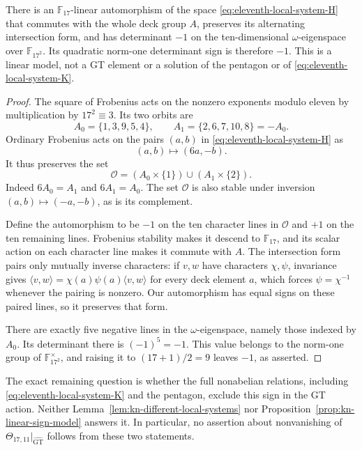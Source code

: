 \begin{proposition}\label{prop:kn-linear-sign-model}
There is an $\mathbb F_{17}$-linear automorphism of the space \eqref{eq:eleventh-local-system-H}
that commutes with the whole deck group $A$, preserves its
alternating intersection form, and has determinant $-1$ on the
ten-dimensional $\omega$-eigenspace over $\mathbb F_{17^2}$.
Its quadratic norm-one determinant sign is therefore $-1$.
This is a linear model, not a GT element or a solution of the
pentagon or of \eqref{eq:eleventh-local-system-K}.
\end{proposition}
\begin{proof}
The square of Frobenius acts on the nonzero exponents modulo
eleven by multiplication by $17^2\equiv3$.  Its two orbits are
\[
 A_0=\{1,3,9,5,4\},\qquad
 A_1=\{2,6,7,10,8\}=-A_0.
\]
Ordinary Frobenius acts on the pairs $(a,b)$ in \eqref{eq:eleventh-local-system-H} as
\[
 (a,b)\longmapsto(6a,-b).
\]
It thus preserves the set
\[
 \mathcal O=(A_0\times\{1\})\cup(A_1\times\{2\}).
\]
Indeed $6A_0=A_1$ and $6A_1=A_0$.
The set $\mathcal O$ is also stable under inversion
$(a,b)\mapsto(-a,-b)$, as is its complement.

Define the automorphism to be $-1$ on the ten character lines in
$\mathcal O$ and $+1$ on the ten remaining lines.  Frobenius
stability makes it descend to $\mathbb F_{17}$, and its scalar
action on each character line makes it commute with $A$.
The intersection form pairs only mutually inverse characters:
if $v,w$ have characters $\chi,\psi$, invariance gives
$\langle v,w\rangle=\chi(a)\psi(a)\langle v,w\rangle$ for every
deck element $a$, which forces $\psi=\chi^{-1}$ whenever the
pairing is nonzero.  Our automorphism has equal signs on these
paired lines, so it preserves that form.

There are exactly five negative lines in the $\omega$-eigenspace,
namely those indexed by $A_0$.  Its determinant there is
$(-1)^5=-1$.  This value belongs to the norm-one group of
$\mathbb F_{17^2}^\times$, and raising it to
$(17+1)/2=9$ leaves $-1$, as asserted.
\end{proof}

The exact remaining question is whether the full nonabelian
relations, including \eqref{eq:eleventh-local-system-K} and the pentagon, exclude this sign in
the GT action.  Neither Lemma~\ref{lem:kn-different-local-systems}
nor Proposition~\ref{prop:kn-linear-sign-model} answers it.
In particular, no assertion about nonvanishing of
$\Theta_{17,11}|_{\widehat{\mathrm{GT}}}$ follows from these two statements.
